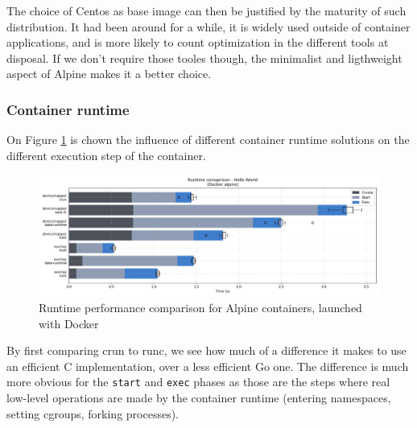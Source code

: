 The choice of Centos as base image can then be justified by the maturity of such distribution.  It had been around for a while, it is widely used outside of container applications, and is more likely to count optimization in the different tools at disposal.  If we don't require those tooles though, the minimalist and ligthweight aspect of Alpine makes it a better choice.

\subsubsection{Container runtime}

On Figure \ref{fig:q1:runtime} is chown the influence of different container runtime solutions on the different execution step of the container.  

\begin{figure}[h!]
  \begin{center}
    \includegraphics[width=\linewidth]{images/question-1-runtime.png}
    \caption{Runtime performance comparison for Alpine containers, launched with Docker}
    \label{fig:q1:runtime}
  \end{center}
\end{figure}

By first comparing crun to runc, we see how much of a difference it makes to use an efficient C implementation, over a less efficient Go one.  The difference is much more obvious for the \texttt{start} and \texttt{exec} phases as those are the steps where real low-level operations are made by the container runtime (entering namespaces, setting cgroups, forking processes).  

